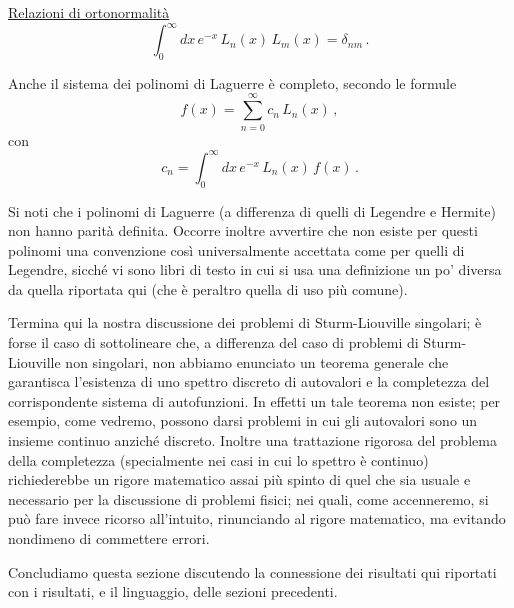 \documentclass[11pt, a4paper]{book}
\numberwithin{equation}{section}
\begin{document}

\medskip
\noindent\underline{Relazioni di ortonormalità}
\begin{equation}
\int_0^{\infty} dx\, e^{-x}\, L_n(x)\, L_m(x) = \delta_{nm} \,. \tag{52}
\end{equation}

Anche il sistema dei polinomi di Laguerre è completo,
secondo le formule
\begin{equation}
f(x) = \sum_{n=0}^{\infty} c_n\, L_n(x) \,, \tag{53}
\end{equation}
con
\begin{equation}
c_n = \int_0^{\infty} dx\, e^{-x}\, L_n(x)\, f(x) \,. \tag{54}
\end{equation}

Si noti che i polinomi di Laguerre (a differenza di quelli
di Legendre e Hermite) non hanno parità definita. Occorre inoltre
avvertire che non esiste per questi polinomi una convenzione così
universalmente accettata come per quelli di Legendre, sicché vi
sono libri di testo in cui si usa una definizione un po' diversa
da quella riportata qui (che è peraltro quella di uso più comune).

Termina qui la nostra discussione dei problemi di Sturm-Liouville singolari; è forse il caso di sottolineare che, a differenza
del caso di problemi di Sturm-Liouville non singolari, non abbiamo
enunciato un teorema generale che garantisca l'esistenza di uno
spettro discreto di autovalori e la completezza del corrispondente
sistema di autofunzioni. In effetti un tale teorema non esiste; per
esempio, come vedremo, possono darsi problemi in cui gli autovalori sono
un insieme continuo anziché discreto. Inoltre una trattazione rigorosa
del problema della completezza (specialmente nei casi in cui lo spettro
è continuo) richiederebbe un rigore matematico assai più spinto di quel
che sia usuale e necessario per la discussione di problemi fisici; nei
quali, come accenneremo, si può fare invece ricorso all'intuito, rinunciando al rigore matematico, ma evitando nondimeno di commettere
errori.

Concludiamo questa sezione discutendo la connessione dei risultati qui riportati con i risultati, e il linguaggio, delle sezioni precedenti.

\end{document}
